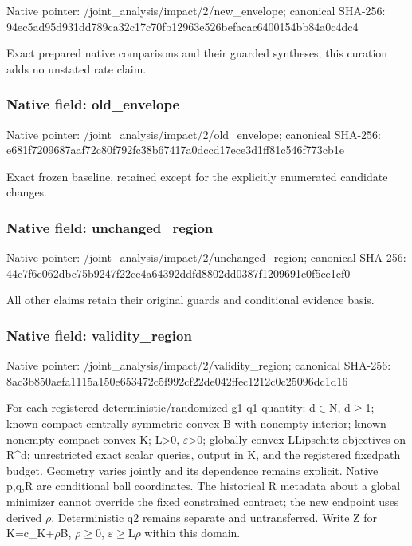 \documentclass[10pt,a4paper]{article}
\begin{document}
Native pointer: /joint\_analysis/impact/2/new\_envelope; canonical SHA-256: 94ec5ad95d931dd789ca32c1\allowbreak{}7c70fb12963e526befacac64\allowbreak{}00154bb84a0c4dc4


Exact prepared native comparisons and their guarded syntheses; this curation adds no unstated rate claim.


\subsubsection{Native field: old\_envelope}


Native pointer: /joint\_analysis/impact/2/old\_envelope; canonical SHA-256: e681f7209687aaf72c80f792\allowbreak{}fc38b67417a0dccd17ece3d1\allowbreak{}ff81c546f773cb1e


Exact frozen baseline, retained except for the explicitly enumerated candidate changes.


\subsubsection{Native field: unchanged\_region}


Native pointer: /joint\_analysis/impact/2\allowbreak{}/unchanged\_region; canonical SHA-256: 44c7f6e062dbc75b9247f22c\allowbreak{}e4a64392ddfd8802dd0387f1\allowbreak{}209691e0f5ce1cf0


All other claims retain their original guards and conditional evidence basis.


\subsubsection{Native field: validity\_region}


Native pointer: /joint\_analysis/impact/2\allowbreak{}/validity\_region; canonical SHA-256: 8ac3b850aefa1115a150e653\allowbreak{}472c5f992cf22de042ffec12\allowbreak{}12c0c25096dc1d16


For each registered deterministic/randomized g1 q1 quantity: d\ensuremath{\in}N, d\ensuremath{\ge}1; known compact centrally symmetric convex B with nonempty interior; known nonempty compact convex K; L>0, \ensuremath{\varepsilon}>0; globally convex LLipschitz objectives on R\textasciicircum{}d; unrestricted exact scalar queries, output in K, and the registered fixedpath budget. Geometry varies jointly and its dependence remains explicit. Native p,q,R are conditional ball coordinates. The historical R metadata about a global minimizer cannot override the fixed constrained contract; the new endpoint uses derived \ensuremath{\rho}. Deterministic q2 remains separate and untransferred. Write Z for K=c\_K+\ensuremath{\rho}B, \ensuremath{\rho}\ensuremath{\ge}0, \ensuremath{\varepsilon}\ensuremath{\ge}L\ensuremath{\rho} within this domain.
\end{document}
